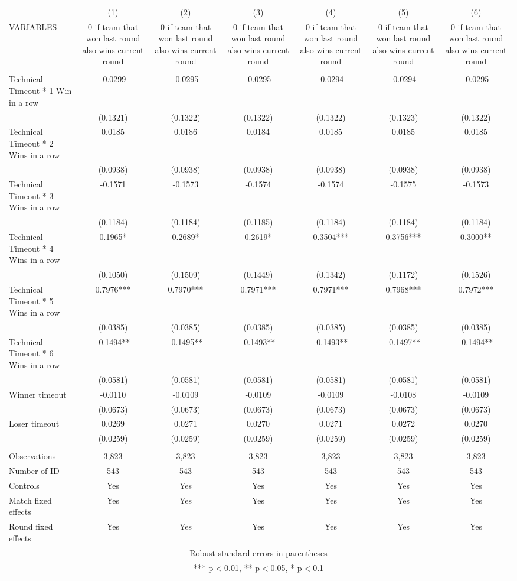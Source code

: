 \documentclass[]{article}
\begin{document}
\begin{tabular}{lcccccc} \hline
 & (1) & (2) & (3) & (4) & (5) & (6) \\
VARIABLES & 0 if team that won last round also wins current round & 0 if team that won last round also wins current round & 0 if team that won last round also wins current round & 0 if team that won last round also wins current round & 0 if team that won last round also wins current round & 0 if team that won last round also wins current round \\ \hline
 &  &  &  &  &  &  \\
Technical Timeout * 1 Win in a row & -0.0299 & -0.0295 & -0.0295 & -0.0294 & -0.0294 & -0.0295 \\
 & (0.1321) & (0.1322) & (0.1322) & (0.1322) & (0.1323) & (0.1322) \\
Technical Timeout * 2 Wins in a row & 0.0185 & 0.0186 & 0.0184 & 0.0185 & 0.0185 & 0.0185 \\
 & (0.0938) & (0.0938) & (0.0938) & (0.0938) & (0.0938) & (0.0938) \\
Technical Timeout * 3 Wins in a row & -0.1571 & -0.1573 & -0.1574 & -0.1574 & -0.1575 & -0.1573 \\
 & (0.1184) & (0.1184) & (0.1185) & (0.1184) & (0.1184) & (0.1184) \\
Technical Timeout * 4 Wins in a row & 0.1965* & 0.2689* & 0.2619* & 0.3504*** & 0.3756*** & 0.3000** \\
 & (0.1050) & (0.1509) & (0.1449) & (0.1342) & (0.1172) & (0.1526) \\
Technical Timeout * 5 Wins in a row & 0.7976*** & 0.7970*** & 0.7971*** & 0.7971*** & 0.7968*** & 0.7972*** \\
 & (0.0385) & (0.0385) & (0.0385) & (0.0385) & (0.0385) & (0.0385) \\
Technical Timeout * 6 Wins in a row & -0.1494** & -0.1495** & -0.1493** & -0.1493** & -0.1497** & -0.1494** \\
 & (0.0581) & (0.0581) & (0.0581) & (0.0581) & (0.0581) & (0.0581) \\
Winner timeout & -0.0110 & -0.0109 & -0.0109 & -0.0109 & -0.0108 & -0.0109 \\
 & (0.0673) & (0.0673) & (0.0673) & (0.0673) & (0.0673) & (0.0673) \\
Loser timeout & 0.0269 & 0.0271 & 0.0270 & 0.0271 & 0.0272 & 0.0270 \\
 & (0.0259) & (0.0259) & (0.0259) & (0.0259) & (0.0259) & (0.0259) \\
 &  &  &  &  &  &  \\
Observations & 3,823 & 3,823 & 3,823 & 3,823 & 3,823 & 3,823 \\
Number of ID & 543 & 543 & 543 & 543 & 543 & 543 \\
Controls & Yes & Yes & Yes & Yes & Yes & Yes \\
Match fixed effects & Yes & Yes & Yes & Yes & Yes & Yes \\
 Round fixed effects & Yes & Yes & Yes & Yes & Yes & Yes \\ \hline
\multicolumn{7}{c}{ Robust standard errors in parentheses} \\
\multicolumn{7}{c}{ *** p$<$0.01, ** p$<$0.05, * p$<$0.1} \\
\end{tabular}
\end{document}

